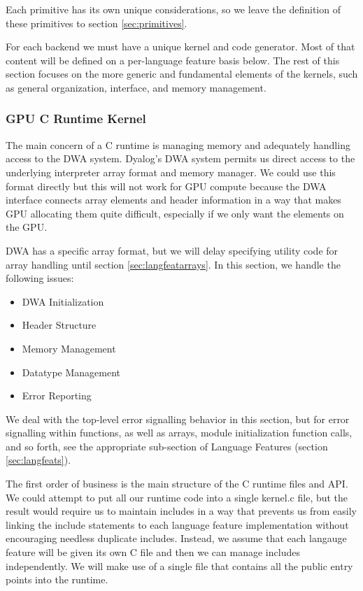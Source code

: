\documentclass{article}%
\begin{document}
Each primitive has its own unique considerations,
so we leave the definition of these primitives
to section \ref{sec:primitives}.

For each backend we must have a unique kernel and code generator.
Most of that content will be defined on a per-language feature basis below.
The rest of this section focuses
on the more generic and fundamental elements
of the kernels,
such as general organization, interface, and memory management.

\subsubsection{GPU C Runtime Kernel}

The main concern of a C runtime is
managing memory and adequately handling access to the DWA system.
Dyalog's DWA system permits us direct access to the
underlying interpreter array format and memory manager.
We could use this format directly
but this will not work for GPU compute
because the DWA interface connects
array elements and header information
in a way that makes GPU allocating them quite difficult,
especially if we only want the elements on the GPU.

DWA has a specific array format,
but we will delay specifying utility code
for array handling until section \ref{sec:langfeatarrays}.
In this section, we handle the following issues:

\begin{itemize}
        \item DWA Initialization
        \item Header Structure
        \item Memory Management
        \item Datatype Management
        \item Error Reporting
\end{itemize}

We deal with the top-level error signalling 
behavior in this section, but for error signalling 
within functions, as well as arrays, module initialization
function calls, and so forth, see the appropriate 
sub-section of Language Features
(section \ref{sec:langfeats}).

The first order of business is the main structure
of the C runtime files and API.
We could attempt to put all our runtime code
into a single {\Tt{}kernel.c\nwendquote} file,
but the result would require us to maintain includes
in a way that prevents us from easily linking
the include statements to each language feature implementation
without encouraging needless duplicate includes.
Instead, we assume that each langauge feature will be given
its own C file and then we can manage includes independently.
We will make use of a single {\Tt{}\nwendquote} file
that contains all the public entry points into the runtime.
\end{document}
